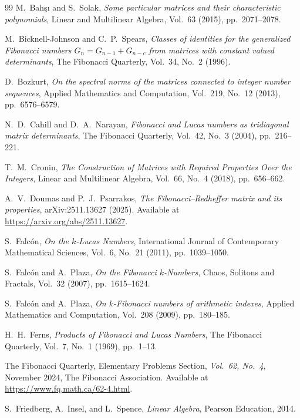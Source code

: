 \documentclass[11pt]{birkjour}
\theoremstyle{definition}
\theoremstyle{remark}
\numberwithin{equation}{section}
\begin{document}
\begin{thebibliography}{99}
M.~Bah{\c s}{\i} and S.~Solak,
\emph{Some particular matrices and their characteristic polynomials},
Linear and Multilinear Algebra,
Vol.~63 (2015), pp.~2071--2078.

M.~Bicknell-Johnson and C.~P.~Spears,
\emph{Classes of identities for the generalized Fibonacci numbers $G_n = G_{n-1} + G_{n-c}$ from matrices with constant valued determinants},
The Fibonacci Quarterly,
Vol.~34, No.~2 (1996).

D.~Bozkurt,
\emph{On the spectral norms of the matrices connected to integer number sequences},
Applied Mathematics and Computation,
Vol.~219, No.~12 (2013), pp.~6576--6579.

N.~D.~Cahill and D.~A.~Narayan,
\emph{Fibonacci and Lucas numbers as tridiagonal matrix determinants},
The Fibonacci Quarterly,
Vol.~42, No.~3 (2004), pp.~216--221.

T.~M.~Cronin,
\emph{The Construction of Matrices with Required Properties Over the Integers},
Linear and Multilinear Algebra,
Vol.~66, No.~4 (2018), pp.~656--662.

A.~V.~Doumas and P.~J.~Psarrakos,
\emph{The Fibonacci--Redheffer matrix and its properties},
arXiv:2511.13627 (2025).
Available at \url{https://arxiv.org/abs/2511.13627}.

S.~Falcón,
\emph{On the $k$-Lucas Numbers},
International Journal of Contemporary Mathematical Sciences,
Vol.~6, No.~21 (2011), pp.~1039--1050.

S.~Falcón and A.~Plaza,
\emph{On the Fibonacci $k$-Numbers},
Chaos, Solitons and Fractals,
Vol.~32 (2007), pp.~1615--1624.

S.~Falcón and A.~Plaza,
\emph{On $k$-Fibonacci numbers of arithmetic indexes},
Applied Mathematics and Computation,
Vol.~208 (2009), pp.~180--185.

H.~H.~Ferns,
\emph{Products of Fibonacci and Lucas Numbers},
The Fibonacci Quarterly,
Vol.~7, No.~1 (1969), pp.~1--13.

The Fibonacci Quarterly, Elementary Problems Section,
\emph{Vol.~62, No.~4}, November 2024,
The Fibonacci Association.
Available at \url{https://www.fq.math.ca/62-4.html}.

S.~Friedberg, A.~Insel, and L.~Spence,
\emph{Linear Algebra},
Pearson Education, 2014.


\end{thebibliography}
\end{document}
